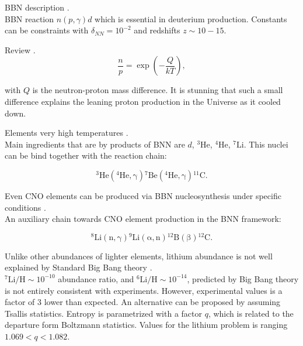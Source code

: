 \documentclass[openany]{book}
\begin{document}
BBN description \cite{coc_vangioni_2010}. \\

BBN reaction $n(p, \gamma)d$ which is essential in deuterium production. Constants can be constraints with $\delta_{NN} = 10^{-2}$ and redshifts $z \sim 10 - 15$.

Review \cite{patrignani_et_particle-data-group_2016}. \\

\begin{equation}\label{eq:reaction_neutronProtonRation}
	\frac{n}{p} = \exp {\left(- \frac{Q}{kT}\right)},
\end{equation}

with $Q$ is the neutron-proton mass difference. It is stunning that such a small difference explains the leaning proton production in the Universe as it cooled down.

Elements very high temperatures \cite{wagoner_fowler_hoyle_1967}. \\

Main ingredients that are by products of BNN are $d$, $\mathrm{{}^{3}He}$, $\mathrm{{}^{4}He}$, $\mathrm{{}^{7}Li}$. This nuclei can be bind together with the reaction chain: 

\begin{equation}\label{eq:reaction_BBN_chain}
	\mathrm{{}^{3}He({}^{4}He, \gamma){}^{7}Be({}^{4}He, \gamma){}^{11}C}.
\end{equation}

Even CNO elements can be produced via BBN nucleosynthesis under specific conditions \cite{su-qing_kai-su_yong-shou_neng-chuan_zhi-hong_2010}.\\

An auxiliary chain towards CNO element production in the BNN framework:

\begin{equation}\label{eq:reaction_BBN_CNO_path}
	\mathrm{{}^{8}Li(n, \gamma){}^{9}Li(\alpha, n){}^{12}B(\beta){}^{12}C}.
\end{equation}

Unlike other abundances of lighter elements, lithium abundance is not well explained by Standard Big Bang theory \cite{bertulani_2019}.  \\

$\mathrm{{}^{7}Li/H} \sim 10^{-10}$ abundance ratio, and  $\mathrm{{}^{6}Li/H} \sim 10^{-14}$, predicted by Big Bang theory is not entirely consistent with experiments. However, experimental values is a factor of 3 lower than expected. An alternative can be proposed by assuming Tsallis statistics. Entropy is parametrized with a factor $q$, which is related to the departure form Boltzmann statistics. Values for the lithium problem is ranging $1.069<q<1.082$.
\end{document}
